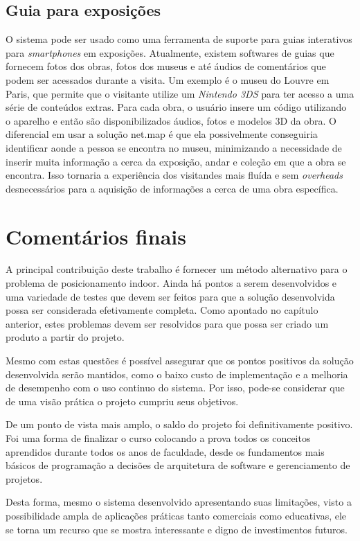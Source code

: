 \subsection{Guia para exposições}
O sistema pode ser usado como uma ferramenta de suporte para guias interativos para \textit{smartphones} em exposições. Atualmente, existem softwares de guias que fornecem fotos dos obras, fotos dos museus e até áudios de comentários que podem ser acessados durante a visita. Um exemplo é o museu do Louvre em Paris, que permite que o visitante utilize um \textit{Nintendo 3DS} para ter acesso a uma série de conteúdos extras. Para cada obra, o usuário insere um código utilizando o aparelho e então são disponibilizados áudios, fotos e modelos 3D da obra. O diferencial em usar a solução net.map é que ela possivelmente conseguiria identificar aonde a pessoa se encontra no museu, minimizando a necessidade de inserir muita informação a cerca da exposição, andar e coleção em que a obra se encontra. Isso tornaria a experiência dos visitandes mais fluída e sem \textit{overheads} desnecessários para a aquisição de informações a cerca de uma obra específica.

\section{Comentários finais}

A principal contribuição deste trabalho é fornecer um método alternativo para o problema de posicionamento indoor. Ainda há pontos a serem desenvolvidos e uma variedade de testes que devem ser feitos para que a solução desenvolvida possa ser considerada efetivamente completa. Como apontado no capítulo anterior, estes problemas devem ser resolvidos para que possa ser criado um produto a partir do projeto.\par
Mesmo com estas questões é possível assegurar que os pontos positivos da solução desenvolvida serão mantidos, como o baixo custo de implementação e a melhoria de desempenho com o uso continuo do sistema. Por isso, pode-se considerar que de uma visão prática o projeto cumpriu seus objetivos.\par
De um ponto de vista mais amplo, o saldo do projeto foi definitivamente positivo. Foi uma forma de finalizar o curso colocando a prova todos os conceitos aprendidos durante todos os anos de faculdade, desde os fundamentos mais básicos de programação a decisões de arquitetura de software e gerenciamento de projetos.\par
Desta forma, mesmo o sistema desenvolvido apresentando suas limitações, visto a possibilidade ampla de aplicações práticas tanto comerciais como educativas, ele se torna um recurso que se mostra interessante e digno de investimentos futuros.
